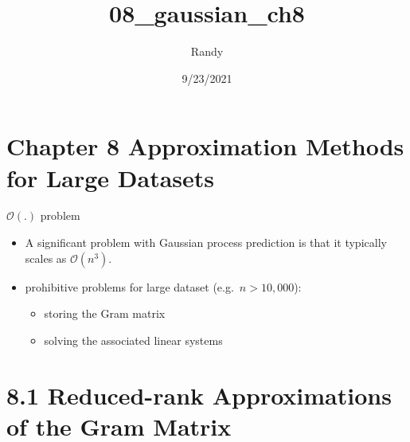 \documentclass[
  ignorenonframetext,
]{beamer}
\title{08\_gaussian\_ch8}
\author{Randy}
\date{9/23/2021}
\providecommand{\tightlist}{%
  \setlength{\itemsep}{0pt}\setlength{\parskip}{0pt}}
\begin{document}
\frame{\titlepage}

\begin{frame}[allowframebreaks]
  \tableofcontents[hideallsubsections]
\end{frame}
\hypertarget{chapter-8-approximation-methods-for-large-datasets}{%
\section{Chapter 8 Approximation Methods for Large
Datasets}\label{chapter-8-approximation-methods-for-large-datasets}}

\begin{frame}{\(\mathcal O(.)\) problem}
\protect\hypertarget{mathcal-o.-problem}{}
\begin{itemize}
\item
  A significant problem with Gaussian process prediction is that it
  typically scales as \(\mathcal O(n^3)\).
\item
  prohibitive problems for large dataset (e.g.~\(n > 10, 000\)):

  \begin{itemize}
  \tightlist
  \item
    storing the Gram matrix
  \item
    solving the associated linear systems
  \end{itemize}
\end{itemize}
\end{frame}

\hypertarget{reduced-rank-approximations-of-the-gram-matrix}{%
\section{8.1 Reduced-rank Approximations of the Gram
Matrix}\label{reduced-rank-approximations-of-the-gram-matrix}}
\end{document}
